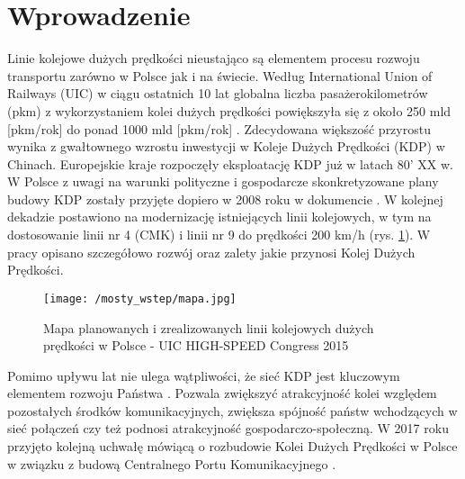 


\chapter*{Wprowadzenie}

\setcounter{figure}{0} 

Linie kolejowe dużych prędkości nieustająco są elementem procesu rozwoju transportu zarówno w Polsce jak i na świecie. Według International Union of Railways (UIC) w ciągu ostatnich 10 lat globalna liczba pasażerokilometrów (pkm) z wykorzystaniem kolei dużych prędkości powiększyła się z około 250 mld [pkm/rok] do ponad 1000 mld [pkm/rok] \parencite{UIC2021}. Zdecydowana większość przyrostu wynika z gwałtownego wzrostu inwestycji w Koleje Dużych Prędkości (KDP) w Chinach. Europejskie kraje rozpoczęły eksploatację KDP już w latach 80' XX w. W Polsce z uwagi na warunki polityczne i gospodarcze skonkretyzowane plany budowy KDP zostały przyjęte dopiero w 2008 roku w dokumencie \parencite{UchwaaNr276}. W kolejnej dekadzie postawiono na modernizację istniejących linii kolejowych, w tym na dostosowanie linii nr 4 (CMK) i linii nr 9 do prędkości 200 km/h (rys. \ref{fig:LDP_mapa}). W pracy \parencite{Towpik2010} opisano szczegółowo rozwój oraz zalety jakie przynosi Kolej Dużych Prędkości. 

\begin{figure}[hbt!]
	\centering
	\texttt{[image: /mosty\_wstep/mapa.jpg]}
	\captionsetup{justification=centering}
	\caption{Mapa planowanych i zrealizowanych linii kolejowych dużych prędkości w Polsce - UIC HIGH-SPEED Congress 2015 \parencite{UIC2015}}
	\label{fig:LDP_mapa}
\end{figure}

Pomimo upływu lat nie ulega wątpliwości, że sieć KDP jest kluczowym elementem rozwoju Państwa \parencite{Raczynski2010}. Pozwala zwiększyć atrakcyjność kolei względem pozostałych środków komunikacyjnych, zwiększa spójność państw wchodzących w sieć połączeń czy też podnosi atrakcyjność gospodarczo-społeczną. W 2017 roku przyjęto kolejną uchwałę mówiącą o rozbudowie Kolei Dużych Prędkości w Polsce w związku z budową Centralnego Portu Komunikacyjnego \parencite{UchwaaNr173}. 


